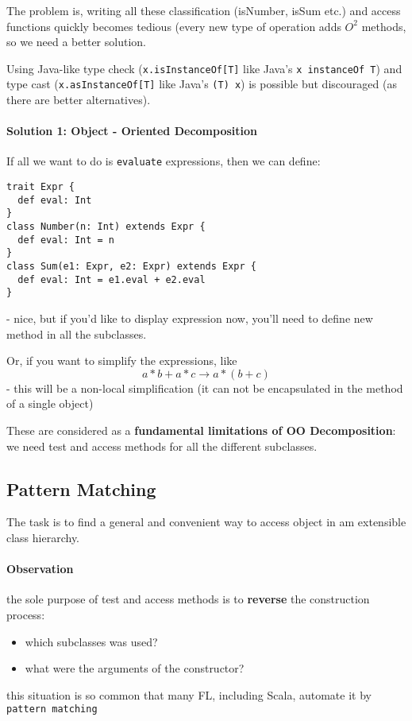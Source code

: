 \documentclass{scrartcl}
\newcommand{\term}[1]{\verb~#1~} %
\begin{document}
The problem is, writing all these classification (isNumber, isSum etc.) and
access functions quickly becomes tedious (every new type of operation adds $O^2$
methods, so we need a better solution.

Using Java-like type check (\lstinline|x.isInstanceOf[T]| like Java's
\lstinline|x instanceOf T|) and type cast (\lstinline|x.asInstanceOf[T]| like
Java's \lstinline|(T) x|) is possible but discouraged (as there are better
alternatives). 

\paragraph{Solution 1: Object - Oriented Decomposition}

If all we want to do is \term{evaluate} expressions, then we can define:
\begin{lstlisting}
trait Expr {
  def eval: Int
}
class Number(n: Int) extends Expr {
  def eval: Int = n
}
class Sum(e1: Expr, e2: Expr) extends Expr {
  def eval: Int = e1.eval + e2.eval
}
\end{lstlisting}
- nice, but if you'd like to display expression now, you'll need to define new
method in all the subclasses.

Or, if you want to simplify the expressions, like 
$$ a * b + a * c \to a * (b + c)$$
- this will be a non-local simplification (it can not be encapsulated in the
method of a single object)

These are considered as a {\bf fundamental limitations of OO Decomposition}: we
need test and access methods for all the different subclasses.

\subsection{Pattern Matching }
\label{sec:PatternMatching}

The task is to find a general and convenient way to access object in am
extensible class hierarchy.

\paragraph{Observation}the sole purpose of test and access methods is to {\bf
  reverse} the construction process:
\begin{itemize}
\item which subclasses was used?
\item what were the arguments of the constructor?
\end{itemize}
this situation is so common that many FL, including Scala, automate it by
\term{pattern matching}
\end{document}
